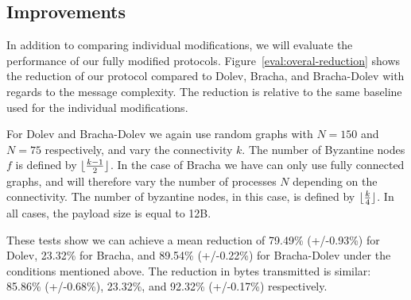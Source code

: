 
\subsection{Improvements}
In addition to comparing individual modifications, we will evaluate the performance of our fully modified protocols. Figure~\ref{eval:overal-reduction} shows the reduction of our protocol compared to Dolev, Bracha, and Bracha-Dolev with regards to the message complexity. The reduction is relative to the same baseline used for the individual modifications.

For Dolev and Bracha-Dolev we again use random graphs with $N=150$ and $N=75$ respectively, and vary the connectivity $k$. The number of Byzantine nodes $f$ is defined by $\lfloor\frac{k-1}{2}\rfloor$. In the case of Bracha we have can only use fully connected graphs, and will therefore vary the number of processes $N$ depending on the connectivity. The number of byzantine nodes, in this case, is defined by $\lfloor\frac{k}{4}\rfloor$. In all cases, the payload size is equal to 12B. 

These tests show we can achieve a mean reduction of 79.49\% (+/-0.93\%) for Dolev, 23.32\% for Bracha, and 89.54\% (+/-0.22\%) for Bracha-Dolev under the conditions mentioned above. The reduction in bytes transmitted is similar: 85.86\% (+/-0.68\%), 23.32\%, and 92.32\% (+/-0.17\%) respectively. 

